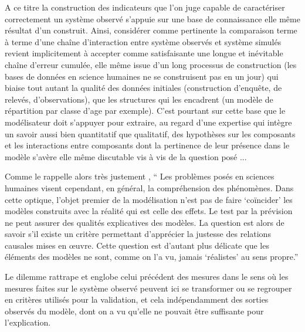 A ce titre la construction des indicateurs que l'on juge capable de caractériser correctement un système observé s'appuie sur une base de connaissance elle même résultat d'un construit. Ainsi, considérer comme pertinente la comparaison terme à terme d'une chaîne d'interaction entre système observés et système simulés  revient implicitement à accepter comme satisfaisante une longue et inévitable chaîne d'erreur cumulée, elle même issue d'un long processus de construction (les bases de données en science humaines ne se construisent pas en un jour) qui biaise tout autant la qualité des données initiales (construction d'enquête, de relevés, d'observations), que les structures qui les encadrent (un modèle de répartition par classe d'age par exemple). C'est pourtant sur cette base que le modélisateur doit s'appuyer pour extraire, au regard d'une expertise qui intègre un savoir aussi bien quantitatif que qualitatif, des hypothèses sur les composants et les interactions entre composants dont la pertinence de leur présence dans le modèle s'avère elle même discutable vis à vis de la question posé ...





Comme le rappelle alors très justement \textcite[32]{Bulle2005}, \enquote{ Les problèmes posés en sciences humaines visent cependant, en général, la compréhension des phénomènes. Dans cette optique, l’objet premier de la modélisation n’est pas de faire \enquote{coïncider} les modèles construits avec la réalité qui est celle des effets. Le test par la prévision ne peut assurer des qualités explicatives des modèles. La question est alors de savoir s’il existe un critère permettant d’apprécier la justesse des relations causales mises en œuvre. Cette question est d’autant plus délicate que les éléments des modèles ne sont, comme on l’a vu, jamais \enquote{réalistes} au sens propre.}


Le dilemme rattrape et englobe celui précédent des mesures dans le sens où les mesures faites sur le système observé peuvent ici se transformer ou se regrouper en critères utilisés pour la validation, et cela indépendamment des sorties observés du modèle, dont on a vu qu'elle ne pouvait être suffisante pour l'explication.

